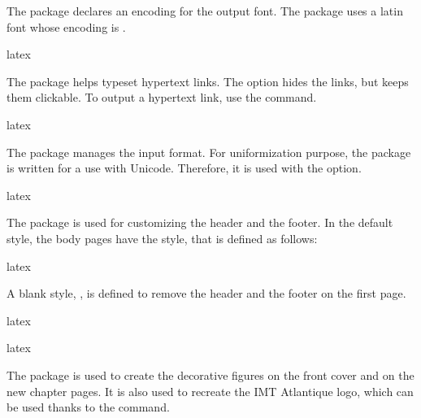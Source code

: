 \documentclass{report}
\begin{document}
The  package declares an encoding for the output font.
The  package uses a latin font whose encoding is .

\begin{imtaCode}{latex}
\RequirePackage[T1]{fontenc}
\end{imtaCode}


The  package helps typeset hypertext links.
The  option hides the links, but keeps them clickable.
To output a hypertext link, use the  command.

\begin{imtaCode}{latex}
\RequirePackage[hidelinks]{hyperref}
\end{imtaCode}


The  package manages the input format.
For uniformization purpose, the  package is written for a use with Unicode.
Therefore, it is used with the  option.

\begin{imtaCode}{latex}
\RequirePackage[utf8]{inputenc}
\end{imtaCode}


The  package is used for customizing the header and the footer.
In the default style, the body pages have the  style, that is defined as follows:

\begin{imtaCode}{latex}
\pagestyle{fancy}
\fancyhead{}
\fancyfoot{}
\fancyhead[L]{\thetitle}
\fancyhead[R]{\imtaTheAuthorShort}
\fancyfoot[C]{\thepage}
\end{imtaCode}

A blank style, , is defined to remove the header and the footer on the first page.

\begin{imtaCode}{latex}
\end{imtaCode}


\begin{imtaCode}{latex}
\RequirePackage{fancyhdr}
\end{imtaCode}


The  package is used to create the decorative figures on the front cover and on the new chapter pages. 
It is also used to recreate the IMT Atlantique logo, which can be used thanks to the  command.
\end{document}
